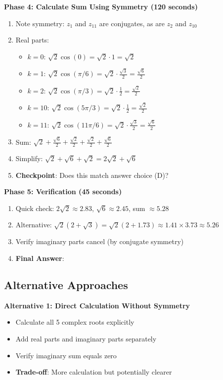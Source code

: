 \documentclass[11pt]{article}
\begin{document}
\begin{roadmapbox}
\textbf{Phase 4: Calculate Sum Using Symmetry (120 seconds)}
\begin{enumerate}[leftmargin=*]
    \item Note symmetry: $z_1$ and $z_{11}$ are conjugates, as are $z_2$ and $z_{10}$
    \item Real parts: 
    \begin{itemize}
        \item $k=0$: $\sqrt{2}\cos(0) = \sqrt{2} \cdot 1 = \sqrt{2}$
        \item $k=1$: $\sqrt{2}\cos(\pi/6) = \sqrt{2} \cdot \frac{\sqrt{3}}{2} = \frac{\sqrt{6}}{2}$
        \item $k=2$: $\sqrt{2}\cos(\pi/3) = \sqrt{2} \cdot \frac{1}{2} = \frac{\sqrt{2}}{2}$
        \item $k=10$: $\sqrt{2}\cos(5\pi/3) = \sqrt{2} \cdot \frac{1}{2} = \frac{\sqrt{2}}{2}$
        \item $k=11$: $\sqrt{2}\cos(11\pi/6) = \sqrt{2} \cdot \frac{\sqrt{3}}{2} = \frac{\sqrt{6}}{2}$
    \end{itemize}
    \item Sum: $\sqrt{2} + \frac{\sqrt{6}}{2} + \frac{\sqrt{2}}{2} + \frac{\sqrt{2}}{2} + \frac{\sqrt{6}}{2}$
    \item Simplify: $\sqrt{2} + \sqrt{6} + \sqrt{2} = 2\sqrt{2} + \sqrt{6}$
    \item \textbf{Checkpoint}: Does this match answer choice (D)? \checkmark
\end{enumerate}

\textbf{Phase 5: Verification (45 seconds)}
\begin{enumerate}[leftmargin=*]
    \item Quick check: $2\sqrt{2} \approx 2.83$, $\sqrt{6} \approx 2.45$, sum $\approx 5.28$
    \item Alternative: $\sqrt{2}(2+\sqrt{3}) = \sqrt{2}(2+1.73) \approx 1.41 \times 3.73 \approx 5.26$ \checkmark
    \item Verify imaginary parts cancel (by conjugate symmetry) \checkmark
    \item \textbf{Final Answer}: 
\end{enumerate}

\subsection*{Alternative Approaches}

\textbf{Alternative 1: Direct Calculation Without Symmetry}
\begin{itemize}[leftmargin=*]
    \item Calculate all 5 complex roots explicitly
    \item Add real parts and imaginary parts separately
    \item Verify imaginary sum equals zero
    \item \textbf{Trade-off}: More calculation but potentially clearer
\end{itemize}


\end{roadmapbox}
\end{document}
